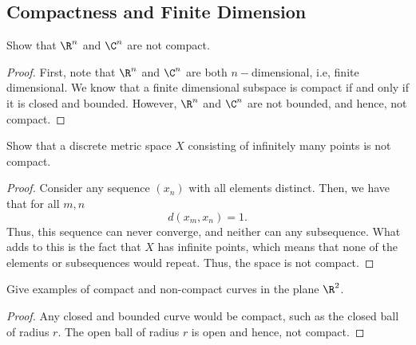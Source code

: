 \subsection{Compactness and Finite Dimension}

\begin{question}
    Show that $\R^n$ and $\C^n$ are not compact.
    \label{section2.5-1}
\end{question}
\begin{proof}
    First, note that $\R^n$ and $\C^n$ are both $n-$dimensional, i.e, finite dimensional. We know that a finite dimensional subspace is compact if and only if it is closed and bounded. However, $\R^n$ and $\C^n$ are not bounded, and hence, not compact.
\end{proof}

\begin{question}
    Show that a discrete metric space $X$ consisting of infinitely many points is not compact.
    \label{section2.5-2}
\end{question}
\begin{proof}
    Consider any sequence $(x_n)$ with all elements distinct. Then, we have that for all $m,n$
    \[d(x_m , x_n) = 1.\]
    Thus, this sequence can never converge, and neither can any subsequence. What adds to this is the fact that $X$ has infinite points, which means that none of the elements or subsequences would repeat. Thus, the space is not compact.
\end{proof}

\begin{question}
    Give examples of compact and non-compact curves in the plane $\R^2$.
    \label{section2.5-3}
\end{question}
\begin{proof}
    Any closed and bounded curve would be compact, such as the closed ball of radius $r$. The open ball of radius $r$ is open and hence, not compact.
\end{proof}

